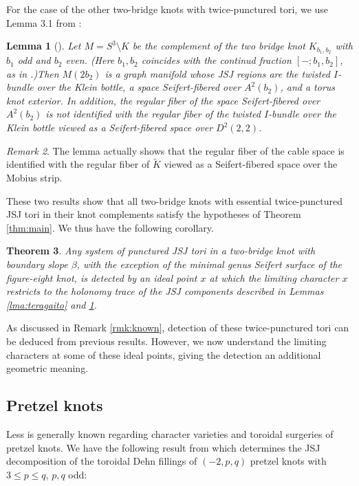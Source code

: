 \documentclass{article}
\theoremstyle{plain}
\newtheorem{theorem}{Theorem}[section]
\theoremstyle{definition}
\theoremstyle{plain}
\theoremstyle{plain}
\theoremstyle{plain}
\newtheorem{lemma}[theorem]{Lemma}
\theoremstyle{remark}
\newtheorem{remark}[theorem]{Remark}
\theoremstyle{remark}
\theoremstyle{plain}
\theoremstyle{plain}
\begin{document}
For the case of the other two-bridge knots with twice-punctured tori, we use Lemma 3.1 from \cite{ClayTeragaito}:

\begin{lemma}[\cite{ClayTeragaito}]\label{lma:clayteragaito}
Let $M = S^3 \setminus K$ be the complement of the two bridge knot $K_{b_1, b_2}$ with $b_1$ odd and $b_2$ even. (Here $b_1, b_2$ coincides with the continud fraction $[-; b_1, b_2]$, as in \cite{Hatcher1985IncompressibleSI}.)Then $M(2b_2)$ is a graph manifold whose JSJ regions are the twisted $I$-bundle over the Klein bottle, a space Seifert-fibered over $A^2(b_2)$, and a torus knot exterior. In addition, the regular fiber of the space Seifert-fibered over $A^2(b_2)$ is not identified with the regular fiber of the twisted $I$-bundle over the Klein bottle viewed as a Seifert-fibered space over $D^2(2, 2)$. 
\end{lemma}

\begin{remark}
The lemma actually shows that the regular fiber of the cable space is identified with the regular fiber of $\tilde{K}$ viewed as a Seifert-fibered space over the Mobius strip. 
\end{remark}

These two results show that all two-bridge knots with essential twice-punctured JSJ tori in their knot complements satisfy the hypotheses of Theorem \ref{thm:main}. We thus have the following corollary. 

\begin{theorem}\label{thm:twobridge}
Any system of punctured JSJ tori in a two-bridge knot with boundary slope $\beta$, with the exception of the minimal genus Seifert surface of the figure-eight knot, is detected by an ideal point $x$ at which the limiting character $x$ restricts to the holonomy trace of the JSJ components described in Lemmas \ref{lma:teragaito} and \ref{lma:clayteragaito}.
\end{theorem}

As discussed in Remark \ref{rmk:known}, detection of these twice-punctured tori can be deduced from previous results. However, we now understand the limiting characters at some of these ideal points, giving the detection an additional geometric meaning. 

\subsection{Pretzel knots}

Less is generally known regarding character varieties and toroidal surgeries of pretzel knots. We have the following result from \cite{IchiharaJongKabaya} which determines the JSJ decomposition of the toroidal Dehn fillings of $(-2, p, q)$ pretzel knots with $3 \leq p \leq q$, $p, q$ odd:
\end{document}
